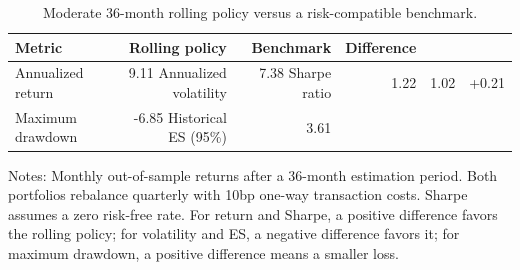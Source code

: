 \begin{table}[htbp]
\centering
\footnotesize
\caption{Moderate 36-month rolling policy versus a risk-compatible benchmark.}
\label{tab:gbi-moderate-rolling-benchmark}
\begin{tabular}{lrrr}
\toprule
Metric & Rolling policy & Benchmark & Difference \\
\midrule
Annualized return & 9.11%
Annualized volatility & 7.38%
Sharpe ratio & 1.22 & 1.02 & +0.21 \\
Maximum drawdown & -6.85%
Historical ES (95\%) & 3.61%
\bottomrule
\end{tabular}
\vspace{2pt}
\begin{minipage}{0.96\linewidth}
\footnotesize
Notes: Monthly out-of-sample returns after a 36-month estimation period. Both portfolios rebalance quarterly with 10bp one-way transaction costs. Sharpe assumes a zero risk-free rate. For return and Sharpe, a positive difference favors the rolling policy; for volatility and ES, a negative difference favors it; for maximum drawdown, a positive difference means a smaller loss.
\end{minipage}
\end{table}
